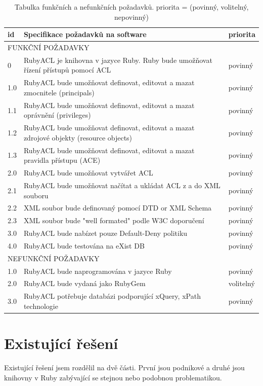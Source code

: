\documentclass[11pt,twoside,a4paper]{book}
\begin{document}
\begin{table}%
\begin{center}
\begin{tabular}{|l|p{9cm}|l|}
\hline
\textbf{id} & \textbf{Specifikace požadavků na software} & \textbf{priorita} \\
\hline
\multicolumn{3}{|l|}{FUNKČNÍ POŽADAVKY} \\
\hline
0 & RubyACL je knihovna v jazyce Ruby. Ruby bude umožňovat řízení přístupů pomocí ACL & povinný\\
\hline
1.0 & RubyACL bude umožňovat definovat, editovat a mazat zmocnitele (principals) & povinný\\
\hline
1.1 & RubyACL bude umožňovat definovat, editovat a mazat oprávnění (privileges) & povinný\\
\hline
1.2 & RubyACL bude umožňovat definovat, editovat a mazat  zdrojové objekty (resource objects) & povinný\\
\hline
1.3 & RubyACL bude umožňovat definovat, editovat a mazat pravidla přístupu (ACE) & povinný\\
\hline
2.0 & RubyACL bude umožňovat vytvářet ACL & povinný\\
\hline
2.1 & RubyACL bude umožňovat načítat a ukládat ACL z a do XML souboru & povinný\\
\hline
2.2 & XML soubor bude definovaný pomocí DTD or XML Schema & povinný\\
\hline
2.3 & XML soubor bude "well formated" podle W3C doporučení & povinný\\
\hline
3.0 & RubyACL bude nabízet pouze Default-Deny politiku & povinný\\
\hline
4.0 & RubyACL bude testována na eXist DB & povinný\\
\hline
\multicolumn{3}{|l|}{NEFUNKČNÍ POŽADAVKY} \\
\hline
1.0 & RubyACL bude naprogramována v jazyce Ruby & povinný \\
\hline
2.0 & RubyACL bude vydaná jako RubyGem & volitelný\\
\hline
3.0 & RubyACL potřebuje databázi podporující xQuery, xPath technologie & povinný\\
\hline
\end{tabular}
\end{center}
\caption{Tabulka funkčních a nefunkčních požadavků. priorita = (povinný, volitelný, nepovinný)}
\label{tab:tab1}
\end{table}

\section{Existující řešení}
Existující řešení jsem rozdělil na dvě části. První jsou podnikové a druhé jsou knihovny v Ruby zabývající se stejnou nebo podobnou problematikou.
\end{document}
